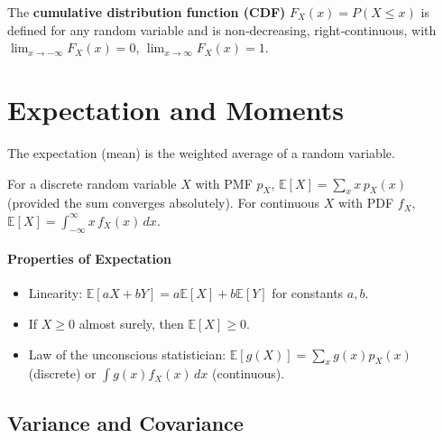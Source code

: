 \documentclass{tufte-handout}
\begin{document}
The \textbf{cumulative distribution function (CDF)} $F_X(x) = P(X \le x)$ is defined for any random variable and is non‑decreasing, right‑continuous, with $\lim_{x\to-\infty}F_X(x)=0$, $\lim_{x\to\infty}F_X(x)=1$.

\begin{marginfigure}
\centering
{}
\caption{PDF of the standard normal distribution.}
\end{marginfigure}

\section{Expectation and Moments}

The expectation (mean) is the weighted average of a random variable.

\begin{defn}[Expectation]
    For a discrete random variable $X$ with PMF $p_X$, $\mathbb{E}[X] = \sum_{x} x\, p_X(x)$ (provided the sum converges absolutely). For continuous $X$ with PDF $f_X$, $\mathbb{E}[X] = \int_{-\infty}^{\infty} x\, f_X(x)\,dx$.
\end{defn}

\paragraph{Properties of Expectation}
\begin{itemize}
    \item Linearity: $\mathbb{E}[aX + bY] = a\mathbb{E}[X] + b\mathbb{E}[Y]$ for constants $a,b$.
    \item If $X \ge 0$ almost surely, then $\mathbb{E}[X] \ge 0$.
    \item Law of the unconscious statistician: $\mathbb{E}[g(X)] = \sum_x g(x)p_X(x)$ (discrete) or $\int g(x)f_X(x)\,dx$ (continuous).
\end{itemize}

\subsection{Variance and Covariance}
\end{document}
